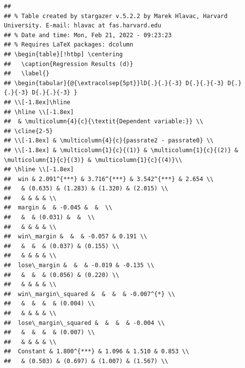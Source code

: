 \documentclass[
  12pt,
  landscape]{article}
\begin{document}
\begin{verbatim}
## 
## % Table created by stargazer v.5.2.2 by Marek Hlavac, Harvard University. E-mail: hlavac at fas.harvard.edu
## % Date and time: Mon, Feb 21, 2022 - 09:23:23
## % Requires LaTeX packages: dcolumn 
## \begin{table}[!htbp] \centering 
##   \caption{Regression Results (d)} 
##   \label{} 
## \begin{tabular}{@{\extracolsep{5pt}}lD{.}{.}{-3} D{.}{.}{-3} D{.}{.}{-3} D{.}{.}{-3} } 
## \\[-1.8ex]\hline 
## \hline \\[-1.8ex] 
##  & \multicolumn{4}{c}{\textit{Dependent variable:}} \\ 
## \cline{2-5} 
## \\[-1.8ex] & \multicolumn{4}{c}{passrate2 - passrate0} \\ 
## \\[-1.8ex] & \multicolumn{1}{c}{(1)} & \multicolumn{1}{c}{(2)} & \multicolumn{1}{c}{(3)} & \multicolumn{1}{c}{(4)}\\ 
## \hline \\[-1.8ex] 
##  win & 2.091^{***} & 3.716^{***} & 3.542^{***} & 2.654 \\ 
##   & (0.635) & (1.283) & (1.320) & (2.015) \\ 
##   & & & & \\ 
##  margin &  & -0.045 &  &  \\ 
##   &  & (0.031) &  &  \\ 
##   & & & & \\ 
##  win\_margin &  &  & -0.057 & 0.191 \\ 
##   &  &  & (0.037) & (0.155) \\ 
##   & & & & \\ 
##  lose\_margin &  &  & -0.019 & -0.135 \\ 
##   &  &  & (0.056) & (0.220) \\ 
##   & & & & \\ 
##  win\_margin\_squared &  &  &  & -0.007^{*} \\ 
##   &  &  &  & (0.004) \\ 
##   & & & & \\ 
##  lose\_margin\_squared &  &  &  & -0.004 \\ 
##   &  &  &  & (0.007) \\ 
##   & & & & \\ 
##  Constant & 1.800^{***} & 1.096 & 1.510 & 0.853 \\ 
##   & (0.503) & (0.697) & (1.007) & (1.567) \\ 

\end{verbatim}
\end{document}
